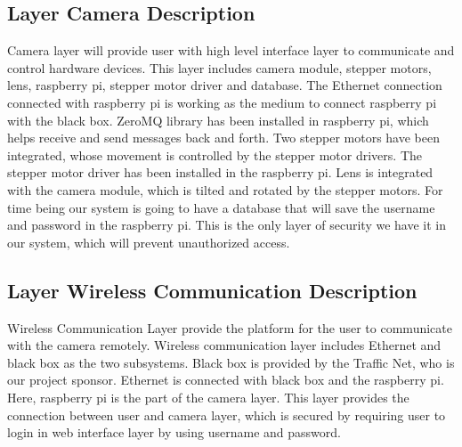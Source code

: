 \subsection{Layer Camera Description}
Camera layer will provide user with high level interface layer to communicate and control hardware devices. This layer includes camera module, stepper motors, lens, raspberry pi, stepper motor driver and database. The Ethernet connection connected with raspberry pi is working as the medium to connect raspberry pi with the black box. ZeroMQ library has been installed in raspberry pi, which helps receive and send messages back and forth. Two stepper motors have been integrated, whose movement is controlled by the stepper motor drivers. The stepper motor driver has been installed in the raspberry pi. Lens is integrated with the camera module, which is tilted and rotated by the stepper motors. For time being our system is going to have a database that will save the username and password in the raspberry pi. This is the only layer of security we have it in our system, which will prevent unauthorized access.




\subsection{Layer Wireless Communication Description}
Wireless Communication Layer provide the platform for the user to communicate with the camera remotely. Wireless communication layer includes Ethernet and black box as the two subsystems. Black box is provided by the Traffic Net, who is our project sponsor. Ethernet is connected with black box and the raspberry pi. Here, raspberry pi is the part of the camera layer. This layer provides the connection between user and camera layer, which is secured by requiring user to login in web interface layer by using username and password.

